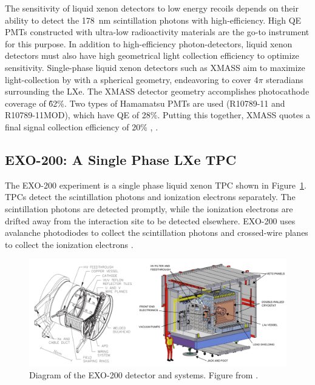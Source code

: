 The sensitivity of liquid xenon detectors to low energy recoils depends on their ability to detect the 178~nm scintillation photons with high-efficiency. High \ac{QE} \ac{PMT}s constructed with ultra-low radioactivity materials are the go-to instrument for this purpose. In addition to high-efficiency photon-detectors, liquid xenon detectors must also have high geometrical light collection efficiency to optimize sensitivity. Single-phase liquid xenon detectors such as XMASS aim to maximize light-collection by with a spherical geometry, endeavoring to cover 4$\pi$ steradians surrounding the \ac{LXe}. The XMASS detector geometry accomplishes photocathode coverage of \~62\%. Two types of Hamamatsu \ac{PMT}s are used (R10789-11 and R10789-11MOD), which have \ac{QE} of 28\%. Putting this together, XMASS quotes a final signal collection efficiency of 20\% \cite{Abe2013}, \cite{XMASSCollaboration2018}. 

\FloatBarrier
\subsection{EXO-200: A Single Phase LXe TPC}
The EXO-200 experiment is a single phase liquid xenon \ac{TPC} shown in Figure~\ref{fig:exo200}. \ac{TPC}s detect the scintillation photons and ionization electrons separately. The scintillation photons are detected promptly, while the ionization electrons are drifted away from the interaction site to be detected elsewhere. EXO-200 uses avalanche photodiodes to collect the scintillation photons and crossed-wire planes to collect the ionization electrons \cite{Auger2012}. 

\begin{figure}[htbp]
\begin{center}
\includegraphics[width=\textwidth]{figures/lxetpcs/exo200.png}
\caption{Diagram of the EXO-200 detector and systems. Figure from \cite{Auger2012}. }
\label{fig:exo200}
\end{center}
\end{figure}

